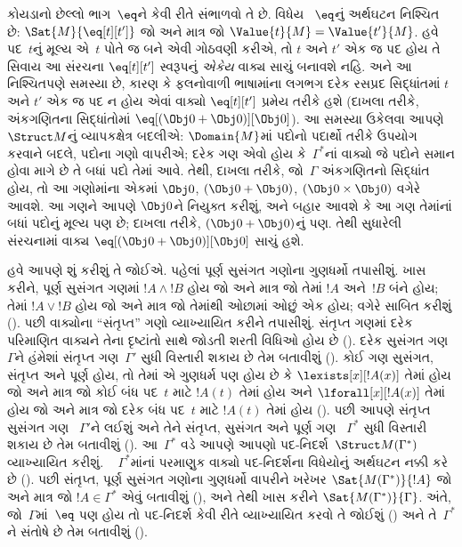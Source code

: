 કોયડાનો છેલ્લો ભાગ~$\eq$ને કેવી રીતે સંભાળવો તે છે. વિધેય
~$\eq$નું અર્થઘટન નિશ્ચિત છે: $\Sat{M}{\eq[t][t']}$ જો અને માત્ર જો
$\Value{t}{M}=\Value{t'}{M}$. હવે પદ~$t$નું મૂલ્ય એ~$t$ પોતે જ બને
એવી ગોઠવણી કરીએ, તો $t$ અને $t'$ એક જ પદ હોય તે સિવાય આ સંરચના
$\eq[t][t']$ સ્વરૂપનું \emph{એકેય} વાક્ય સાચું બનાવશે નહિ. અને આ
નિશ્ચિતપણે સમસ્યા છે, કારણ કે ફલનોવાળી ભાષામાંના લગભગ દરેક
રસપ્રદ સિદ્ધાંતમાં $t$ અને $t'$ એક જ પદ ન હોય એવાં વાક્યો
$\eq[t][t']$ પ્રમેય તરીકે હશે (દાખલા તરીકે, અંકગણિતના સિદ્ધાંતોમાં
$\eq[(\Obj 0+\Obj 0)][\Obj 0]$). આ સમસ્યા ઉકેલવા આપણે~$\Struct M$નું
વ્યાપકક્ષેત્ર બદલીએ: $\Domain{M}$માં પદોનો પદાર્થો તરીકે ઉપયોગ કરવાને
બદલે, પદોના ગણો વાપરીએ; દરેક ગણ એવો હોય કે~$\Gamma^*$નાં વાક્યો જે
પદોને સમાન હોવા માગે છે તે બધાં પદો તેમાં આવે. તેથી, દાખલા તરીકે,
જો~$\Gamma$ અંકગણિતનો સિદ્ધાંત હોય, તો આ ગણોમાંના એકમાં $\Obj 0$,
$(\Obj 0+\Obj 0)$, $(\Obj 0\times\Obj 0)$ વગેરે આવશે. આ ગણને આપણે
$\Obj 0$ને નિયુક્ત કરીશું, અને બહાર આવશે કે આ ગણ તેમાંનાં બધાં પદોનું
મૂલ્ય પણ છે; દાખલા તરીકે, $(\Obj 0+\Obj 0)$નું પણ. તેથી સુધારેલી
સંરચનામાં વાક્ય $\eq[(\Obj 0+\Obj 0)][\Obj 0]$ સાચું હશે.


હવે આપણે શું કરીશું તે જોઈએ. પહેલાં પૂર્ણ સુસંગત ગણોના ગુણધર્મો
તપાસીશું. ખાસ કરીને, પૂર્ણ સુસંગત ગણમાં $!A \land !B$ હોય જો
અને માત્ર જો તેમાં $!A$ અને~$!B$ બંને હોય; તેમાં $!A \lor !B$ હોય જો
અને માત્ર જો તેમાંથી ઓછામાં ઓછું એક હોય; વગેરે સાબિત કરીશું
(). પછી વાક્યોના ``સંતૃપ્ત'' ગણો
  વ્યાખ્યાયિત કરીને તપાસીશું. સંતૃપ્ત ગણમાં દરેક પરિમાણિત
  વાક્યને તેના દૃષ્ટાંતો સાથે જોડતી શરતી વિધિઓ હોય છે
  (). દરેક સુસંગત ગણ~$\Gamma$ને હંમેશાં
  સંતૃપ્ત ગણ~$\Gamma'$ સુધી વિસ્તારી શકાય છે તેમ બતાવીશું
  (). કોઈ ગણ સુસંગત, સંતૃપ્ત અને પૂર્ણ
  હોય, તો તેમાં એ ગુણધર્મ પણ હોય છે કે
  $\lexists[x][!A(x)]$ તેમાં હોય જો અને માત્ર જો કોઈ બંધ
    પદ~$t$ માટે $!A(t)$ તેમાં હોય અને
  $\lforall[x][!A(x)]$ તેમાં હોય જો અને માત્ર જો દરેક
    બંધ પદ~$t$ માટે $!A(t)$ તેમાં હોય
  ().
પછી આપણે સંતૃપ્ત સુસંગત ગણ
~$\Gamma'$ને લઈશું અને તેને
સંતૃપ્ત, સુસંગત અને પૂર્ણ ગણ
~$\Gamma^*$ સુધી વિસ્તારી શકાય છે તેમ બતાવીશું
(). આ~$\Gamma^*$ વડે આપણે આપણો
પદ-નિદર્શ~$\Struct M(\Gamma^*)$
વ્યાખ્યાયિત કરીશું. ~ $\Gamma^*$માંનાં
પરમાણુક વાક્યો પદ-નિદર્શના વિધેયોનું
  અર્થઘટન નક્કી કરે છે
(). પછી
સંતૃપ્ત, પૂર્ણ સુસંગત ગણોના ગુણધર્મો વાપરીને ખરેખર
$\Sat{M(\Gamma^*)}{!A}$ જો અને માત્ર જો
$!A\in\Gamma^*$ એવું બતાવીશું (), અને તેથી ખાસ
કરીને $\Sat{M(\Gamma^*)}{\Gamma}$.
અંતે, જો~$\Gamma$માં~$\eq$ પણ હોય તો પદ-નિદર્શ કેવી રીતે
  વ્યાખ્યાયિત કરવો તે જોઈશું () અને
  તે~$\Gamma^*$ને સંતોષે છે તેમ બતાવીશું ().
\endgroup


